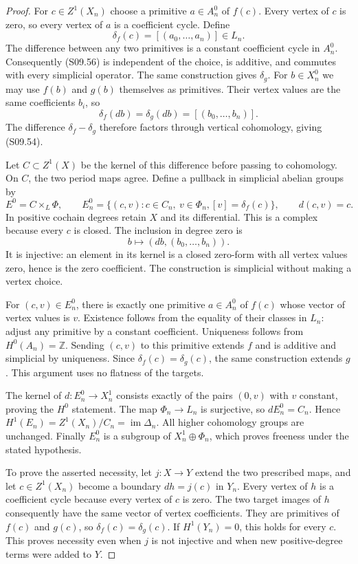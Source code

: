 \begin{proof}
For $c\in Z^1(X_n)$ choose a primitive $a\in A_n^0$ of
$f(c)$.  Every vertex of $c$ is zero, so every vertex of
$a$ is a coefficient cycle.  Define
\[
 \delta_f(c)=[(a_0,\ldots,a_n)]\in L_n.               \tag{S09.56}
\]
The difference between any two primitives is a constant
coefficient cycle in $A_n^0$.  Consequently (S09.56) is
independent of the choice, is additive, and commutes
with every simplicial operator.  The same construction
gives $\delta_g$.  For $b\in X_n^0$ we may use $f(b)$
and $g(b)$ themselves as primitives.  Their vertex
values are the same coefficients $b_i$, so
\[
        \delta_f(db)=\delta_g(db)=[(b_0,\ldots,b_n)].
 \tag{S09.57}
\]
The difference $\delta_f-\delta_g$ therefore factors
through vertical cohomology, giving (S09.54).

Let $C\subset Z^1(X)$ be the kernel of this difference
before passing to cohomology.  On $C$, the two period
maps agree.  Define a pullback in simplicial abelian
groups by
\[
 E^0=C\mathop{\times}_{L}\Phi,
 \qquad
 E_n^0=\{(c,v):c\in C_n,\ v\in\Phi_n,
                          [v]=\delta_f(c)\},
 \qquad d(c,v)=c.                                    \tag{S09.58}
\]
In positive cochain degrees retain $X$ and its differential.
This is a complex because every $c$ is closed.  The
inclusion in degree zero is
\[
                 b\longmapsto (db,(b_0,\ldots,b_n)). \tag{S09.59}
\]
It is injective: an element in its kernel is a closed
zero-form with all vertex values zero, hence is the zero
coefficient.  The construction is simplicial without
making a vertex choice.

For $(c,v)\in E_n^0$, there is exactly one primitive
$a\in A_n^0$ of $f(c)$ whose vector of vertex values
is $v$.  Existence follows from the equality of their
classes in $L_n$: adjust any primitive by a constant
coefficient.  Uniqueness follows from $H^0(A_n)=\mathbb Z$.
Sending $(c,v)$ to this primitive extends $f$ and is
additive and simplicial by uniqueness.  Since
$\delta_f(c)=\delta_g(c)$, the same construction
extends $g$.  This argument uses no flatness of the
targets.

The kernel of $d:E_n^0\to X_n^1$ consists exactly of
the pairs $(0,v)$ with $v$ constant, proving the
$H^0$ statement.  The map $\Phi_n\to L_n$ is
surjective, so $dE_n^0=C_n$.  Hence
$H^1(E_n)=Z^1(X_n)/C_n=\operatorname{im}\Delta_n$.
All higher cohomology groups are unchanged.
Finally $E_n^0$ is a subgroup of $X_n^1\oplus\Phi_n$,
which proves freeness under the stated hypothesis.

To prove the asserted necessity, let $j:X\to Y$
extend the two prescribed maps, and let $c\in Z^1(X_n)$
become a boundary $dh=j(c)$ in $Y_n$.  Every vertex
of $h$ is a coefficient cycle because every vertex of
$c$ is zero.  The two target images of $h$ consequently
have the same vector of vertex coefficients.  They
are primitives of $f(c)$ and $g(c)$, so
$\delta_f(c)=\delta_g(c)$.  If $H^1(Y_n)=0$, this
holds for every $c$.  This proves necessity even
when $j$ is not injective and when new positive-degree
terms were added to $Y$.
\end{proof}

